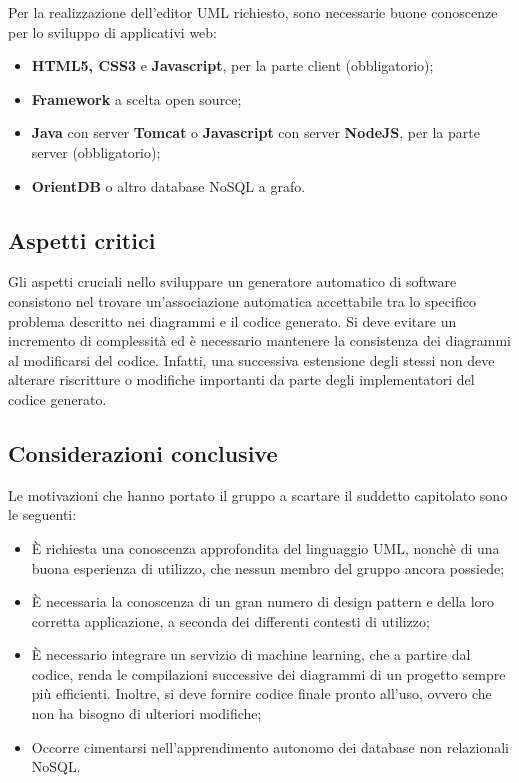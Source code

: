 Per la realizzazione dell'editor UML richiesto, sono necessarie buone conoscenze per lo sviluppo di applicativi web:
\begin{itemize}
	\item \textbf{HTML5, CSS3} e \textbf{Javascript}, per la parte client (obbligatorio);
	\item \textbf{Framework} a scelta open source;
	\item \textbf{Java} con server \textbf{Tomcat} o \textbf{Javascript} con server \textbf{NodeJS}, per la parte server
	(obbligatorio);
	\item \textbf{OrientDB} o altro database NoSQL a grafo.
\end{itemize}

\subsection{Aspetti critici}

Gli aspetti cruciali nello sviluppare un generatore automatico di software consistono nel trovare un'associazione automatica accettabile tra lo specifico problema descritto nei diagrammi e il codice generato. Si deve evitare un incremento di complessità ed è necessario mantenere la consistenza dei diagrammi al modificarsi del codice. Infatti, una successiva estensione degli stessi non deve alterare riscritture o modifiche importanti da parte degli implementatori del codice generato.

\subsection{Considerazioni conclusive}

Le motivazioni che hanno portato il gruppo a scartare il suddetto capitolato sono le seguenti:
\begin{itemize}
	\item {\MakeUppercase{è}} richiesta una conoscenza approfondita del linguaggio UML, nonchè di una buona esperienza di utilizzo, che nessun membro del gruppo ancora possiede;
	\item {\MakeUppercase{è}} necessaria la conoscenza di un gran numero di design pattern e della loro corretta applicazione, a seconda dei differenti contesti di utilizzo;
	\item {\MakeUppercase{è}} necessario integrare un servizio
	di machine learning, che a partire dal codice, renda le compilazioni successive dei diagrammi di un progetto sempre più efficienti. Inoltre, si deve fornire codice finale pronto all'uso, ovvero che non ha bisogno di ulteriori modifiche;
	\item Occorre cimentarsi nell'apprendimento autonomo dei database non relazionali NoSQL.
\end{itemize}